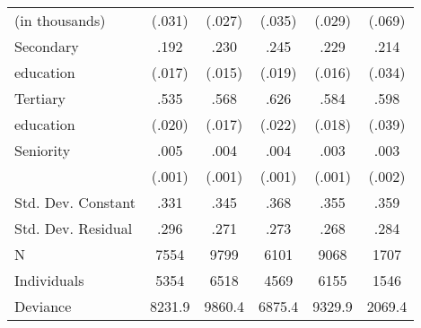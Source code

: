 \documentclass[a4paper,11pt,titlepage]{article}
\begin{document}
\begin{table}[tb]
\begin{tabularx}{\textwidth}{Yccccc}
    \quad (in thousands)%
    				&(.031)	    &(.027)	    &(.035)	&(.029) &(.069)\\
    Secondary 		&.192	    &.230     	&.245	&.229	&.214\\
    \quad education &(.017)     &(.015)	    &(.019)	&(.016)	&(.034)\\
    Tertiary		&.535	    &.568		&.626	&.584	&.598\\
    \quad education &(.020)     &(.017)	    &(.022)	&(.018)	&(.039)\\
    Seniority		&.005	    &.004		&.004	&.003	&.003\\
    				&(.001)	    &(.001)	    &(.001)	&(.001)	&(.002)\\
    \midrule
    Std. Dev. Constant&	.331    &.345       &.368	&.355	&.359\\
    Std. Dev. Residual&	.296    &.271       &.273	&.268	&.284\\
    N			    &7554       &9799       &6101	&9068	&1707\\
    Individuals		&5354       &6518       &4569	&6155	&1546\\
    Deviance		&8231.9     &9860.4     &6875.4 &9329.9 &2069.4\\
    \bottomrule
    \end{tabularx}
\end{table}
\end{document}
